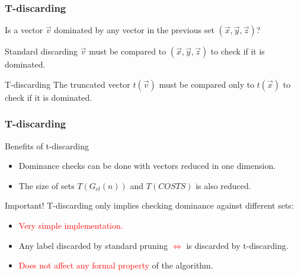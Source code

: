 \begin{frame}
\frametitle{T-discarding}
	Is a vector \textcolor{ao}{$\vec v$ dominated} by any vector in the previous set $(\vec x, \vec y, \vec z)$? 
	\vspace{8mm}
	\begin{block}{Standard discarding}
	\vspace{1mm}
	$\vec v$ \textcolor{ao}{must be compared to} $(\vec x, \vec y, \vec z)$ to check if it is dominated.
	\vspace{1mm} 
	\end{block}
	\vspace{3mm}
	\begin{block}{T-discarding}
	\vspace{1mm}
	 The truncated vector $t(\vec v)$ \textcolor{ao}{must be compared only to} $t(\vec x)$ to check if it is dominated. 
	 \vspace{1mm}
	\end{block}			
\note{}
\end{frame}
\begin{frame}
\frametitle{T-discarding}
\begin{block}{Benefits of t-discarding}
	\vspace{1mm}
		\begin{itemize}
			\item Dominance checks can be done with vectors \textcolor{ao}{reduced in one dimension}.
			\vspace{1mm}
			\item \textcolor{ao}{The size of sets} $T(G_{cl}(n))$ and $T(COSTS)$ \textcolor{ao}{is also reduced}.
		\end{itemize}
	\vspace{1mm}
	\end{block}
	\vspace{2mm}
	\begin{alertblock}{Important!}
		\vspace{1mm}
		T-discarding only implies checking dominance against different sets:
		\begin{itemize}
			\item \textcolor{red}{Very simple implementation.}
			\vspace{1mm}
			\item Any label discarded by standard pruning \textcolor{red}{$\Longleftrightarrow$} is discarded by t-discarding.
			\vspace{1mm}
			\item \textcolor{red}{Does not affect any formal property} of the algorithm.
		\end{itemize}			
	\end{alertblock}
\note{}
\end{frame}

